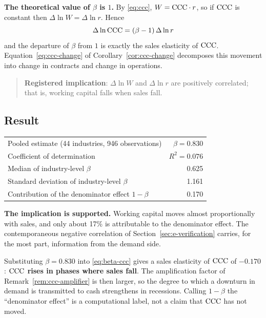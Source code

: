 \textbf{The theoretical value of $\beta$ is $1$.} By \eqref{eq:ccc}, $W=\mathrm{CCC}\cdot r$, so if
$\mathrm{CCC}$ is constant then $\Delta\ln W=\Delta\ln r$. Hence
\begin{equation}
\Delta\ln\mathrm{CCC} = (\beta-1)\,\Delta\ln r
\label{eq:beta-ccc}
\end{equation}
and the departure of $\beta$ from $1$ is exactly the sales elasticity of $\mathrm{CCC}$.
Equation~\eqref{eq:ccc-change} of Corollary~\ref{cor:ccc-change} decomposes this movement into
change in contracts and change in operations.

\begin{quote}
\textbf{Registered implication}: $\Delta\ln W$ and $\Delta\ln r$ are positively correlated; that
is, working capital falls when sales fall.
\end{quote}

\subsection{Result}

\begin{center}
\begin{tabularx}{\textwidth}{@{}Xr@{}}
\toprule
Pooled estimate (44 industries, 946 observations) & $\beta = 0.830$ \\
Coefficient of determination & $R^2 = 0.076$ \\
Median of industry-level $\beta$ & 0.625 \\
Standard deviation of industry-level $\beta$ & 1.161 \\
\midrule
Contribution of the denominator effect $1-\beta$ & 0.170 \\
\bottomrule
\end{tabularx}
\label{tab:wc-elasticity-result}
\end{center}

\textbf{The implication is supported.} Working capital moves almost proportionally with sales,
and only about 17\% is attributable to the denominator effect. The contemporaneous negative
correlation of Section~\ref{sec:e-verification} carries, for the most part, information from the
demand side.

Substituting $\beta=0.830$ into \eqref{eq:beta-ccc} gives a sales elasticity of $\mathrm{CCC}$ of
$-0.170$: \textbf{$\mathrm{CCC}$ rises in phases where sales fall}. The amplification factor of
Remark~\ref{rem:ccc-amplifier} is then larger, so the degree to which a downturn in demand is
transmitted to cash strengthens in recessions. Calling $1-\beta$ the ``denominator effect'' is a
computational label, not a claim that $\mathrm{CCC}$ has not moved.

